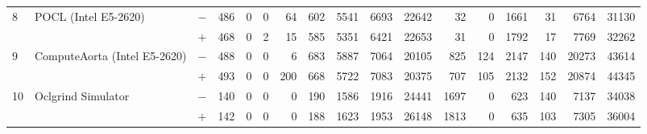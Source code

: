 \begin{tabular}{lll | rrrrrrr | rrrrrrr }
\hline
\multirow{ 2}{*}{8} & \multirow{ 2}{*}{POCL (Intel E5-2620)} & $-$ & 486 & 0 & 0 & 64 & 602 & 5541 & 6693       & 22642 & 32 & 0 & 1661 & 31 & 6764 & 31130 \\& & $+$ & 468 & 0 & 2 & 15 & 585 & 5351 & 6421 & 22653 & 31 & 0 & 1792 & 17 & 7769 & 32262 \\
\hline
\multirow{ 2}{*}{9} & \multirow{ 2}{*}{ComputeAorta (Intel E5-2620)} & $-$ & 488 & 0 & 0 & 6 & 683 & 5887 & 7064       & 20105 & 825 & 124 & 2147 & 140 & 20273 & 43614 \\& & $+$ & 493 & 0 & 0 & 200 & 668 & 5722 & 7083 & 20375 & 707 & 105 & 2132 & 152 & 20874 & 44345 \\
\hline
\multirow{ 2}{*}{10} & \multirow{ 2}{*}{Oclgrind Simulator} & $-$ & 140 & 0 & 0 & 0 & 190 & 1586 & 1916       & 24441 & 1697 & 0 & 623 & 140 & 7137 & 34038 \\& & $+$ & 142 & 0 & 0 & 0 & 188 & 1623 & 1953 & 26148 & 1813 & 0 & 635 & 103 & 7305 & 36004 \\
  \bottomrule
\end{tabular}

